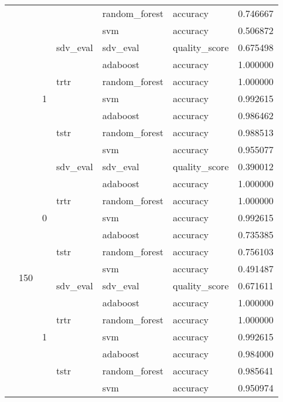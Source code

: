 \begin{longtable}{llllllr}
\cline{5-7}
 &  &  &  & random_forest & accuracy & 0.746667 \\
\cline{5-7}
 &  &  &  & svm & accuracy & 0.506872 \\
\cline{3-7} \cline{4-7} \cline{5-7}
 &  & \multirow[t]{7}{*}{1} & sdv_eval & sdv_eval & quality_score & 0.675498 \\
\cline{4-7} \cline{5-7}
 &  &  & \multirow[t]{3}{*}{trtr} & adaboost & accuracy & 1.000000 \\
\cline{5-7}
 &  &  &  & random_forest & accuracy & 1.000000 \\
\cline{5-7}
 &  &  &  & svm & accuracy & 0.992615 \\
\cline{4-7} \cline{5-7}
 &  &  & \multirow[t]{3}{*}{tstr} & adaboost & accuracy & 0.986462 \\
\cline{5-7}
 &  &  &  & random_forest & accuracy & 0.988513 \\
\cline{5-7}
 &  &  &  & svm & accuracy & 0.955077 \\
\cline{2-7} \cline{3-7} \cline{4-7} \cline{5-7}
 & \multirow[t]{14}{*}{150} & \multirow[t]{7}{*}{0} & sdv_eval & sdv_eval & quality_score & 0.390012 \\
\cline{4-7} \cline{5-7}
 &  &  & \multirow[t]{3}{*}{trtr} & adaboost & accuracy & 1.000000 \\
\cline{5-7}
 &  &  &  & random_forest & accuracy & 1.000000 \\
\cline{5-7}
 &  &  &  & svm & accuracy & 0.992615 \\
\cline{4-7} \cline{5-7}
 &  &  & \multirow[t]{3}{*}{tstr} & adaboost & accuracy & 0.735385 \\
\cline{5-7}
 &  &  &  & random_forest & accuracy & 0.756103 \\
\cline{5-7}
 &  &  &  & svm & accuracy & 0.491487 \\
\cline{3-7} \cline{4-7} \cline{5-7}
 &  & \multirow[t]{7}{*}{1} & sdv_eval & sdv_eval & quality_score & 0.671611 \\
\cline{4-7} \cline{5-7}
 &  &  & \multirow[t]{3}{*}{trtr} & adaboost & accuracy & 1.000000 \\
\cline{5-7}
 &  &  &  & random_forest & accuracy & 1.000000 \\
\cline{5-7}
 &  &  &  & svm & accuracy & 0.992615 \\
\cline{4-7} \cline{5-7}
 &  &  & \multirow[t]{3}{*}{tstr} & adaboost & accuracy & 0.984000 \\
\cline{5-7}
 &  &  &  & random_forest & accuracy & 0.985641 \\
\cline{5-7}
 &  &  &  & svm & accuracy & 0.950974 \\
\cline{1-7} \cline{2-7} \cline{3-7} \cline{4-7} \cline{5-7}
\end{longtable}
